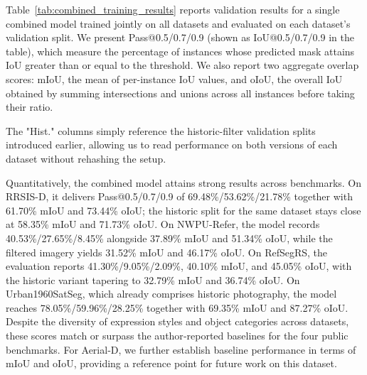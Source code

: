 Table~\ref{tab:combined_training_results} reports validation results for a single combined model trained jointly on all datasets and evaluated on each dataset's validation split. We present Pass@0.5/0.7/0.9 (shown as IoU@0.5/0.7/0.9 in the table), which measure the percentage of instances whose predicted mask attains IoU greater than or equal to the threshold. We also report two aggregate overlap scores: mIoU, the mean of per-instance IoU values, and oIoU, the overall IoU obtained by summing intersections and unions across all instances before taking their ratio.

The "Hist." columns simply reference the historic-filter validation splits introduced earlier, allowing us to read performance on both versions of each dataset without rehashing the setup.

Quantitatively, the combined model attains strong results across benchmarks. On RRSIS-D, it delivers Pass@0.5/0.7/0.9 of 69.48\%/53.62\%/21.78\% together with 61.70\% mIoU and 73.44\% oIoU; the historic split for the same dataset stays close at 58.35\% mIoU and 71.73\% oIoU. On NWPU-Refer, the model records 40.53\%/27.65\%/8.45\% alongside 37.89\% mIoU and 51.34\% oIoU, while the filtered imagery yields 31.52\% mIoU and 46.17\% oIoU. On RefSegRS, the evaluation reports 41.30\%/9.05\%/2.09\%, 40.10\% mIoU, and 45.05\% oIoU, with the historic variant tapering to 32.79\% mIoU and 36.74\% oIoU. On Urban1960SatSeg, which already comprises historic photography, the model reaches 78.05\%/59.96\%/28.25\% together with 69.35\% mIoU and 87.27\% oIoU. Despite the diversity of expression styles and object categories across datasets, these scores match or surpass the author‑reported baselines for the four public benchmarks. For Aerial‑D, we further establish baseline performance in terms of mIoU and oIoU, providing a reference point for future work on this dataset.


